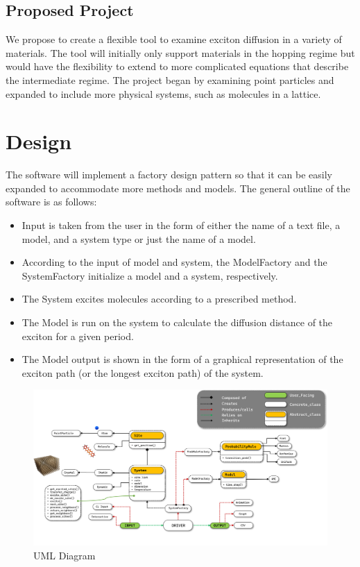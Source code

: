 \documentclass{article}
\begin{document}
\subsection{Proposed Project}

We propose to create a flexible tool to examine exciton diffusion in a variety of materials. The tool will initially only support materials in the hopping regime but would have the flexibility to extend to more complicated equations that describe the intermediate regime. The project began by examining point particles and expanded to include more physical systems, such as molecules in a lattice.

\section{Design}

The software will implement a factory design pattern so that it can be easily expanded to accommodate more methods and models. The general outline of the software is as follows:

\begin{itemize}
    \item Input is taken from the user in the form of either the name of a text file, a model, and a system type or just the name of a model.
    \item According to the input of model and system, the ModelFactory and the SystemFactory initialize a model and a system, respectively.
    \item The System excites molecules according to a prescribed method.
    \item The Model is run on the system to calculate the diffusion distance of the exciton for a given period.
    \item The Model output is shown in the form of a graphical representation of the exciton path (or the longest exciton path) of the system.
\end{itemize}

\begin{figure}
    \centering
   \includegraphics[scale=0.4]{UML_2.png}
    \caption{UML Diagram}
    \label{fig:my_label}
\end{figure}
\end{document}
